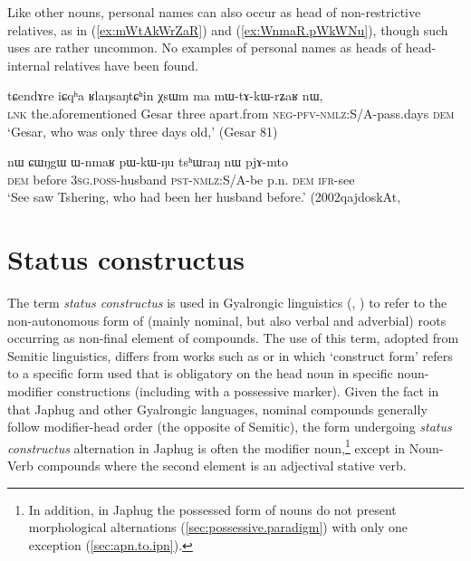 Like other nouns, personal names can also occur as head of non-restrictive relatives, as in  (\ref{ex:mWtAkWrZaR}) and (\ref{ex:WnmaR.pWkWNu}), though such uses are rather uncommon. No examples of personal names as heads of head-internal relatives have been found.

  \begin{exe}
\ex \label{ex:mWtAkWrZaR}
\gll  tɕendɤre 	iɕqʰa 	ʁlaŋsaŋtɕʰin 	χsɯm 	ma 	mɯ-tɤ-kɯ-rʑaʁ 	nɯ, \\
\textsc{lnk} the.aforementioned Gesar three apart.from \textsc{neg}-\textsc{pfv}-\textsc{nmlz}:S/A-pass.days \textsc{dem} \\
\glt `Gesar, who was only three days old,'  (Gesar 81)
\end{exe}

\begin{exe}
\ex \label{ex:WnmaR.pWkWNu}
\gll nɯ ɕɯŋgɯ ɯ-nmaʁ pɯ-kɯ-ŋu tsʰɯraŋ nɯ pjɤ-mto  \\
\textsc{dem} before \textsc{3sg}.\textsc{poss}-husband \textsc{pst}-\textsc{nmlz}:S/A-be p.n. \textsc{dem} \textsc{ifr}-see \\
\glt `See saw Tshering, who had been her husband before.' (2002qajdoskAt, 
\end{exe}

\section{Status constructus} \label{sec:status.constructus}
The term \textit{status constructus} is used in Gyalrongic linguistics (\citealt{jacques12incorp}, \citealt[163-4]{lai17khroskyabs}) to refer to the non-autonomous form of (mainly nominal, but also verbal and adverbial) roots occurring as non-final element of compounds. The use of this term, adopted from Semitic linguistics,  differs from works such as \citet{creissels06hongrois} or \citet{creissels17construct} in which `construct form' refers to a specific form used that is obligatory on the head noun in specific noun-modifier constructions (including with a possessive marker). Given the fact in that Japhug and other Gyalrongic languages, nominal compounds generally follow modifier-head order (the opposite of Semitic), the form undergoing \textit{status constructus} alternation in Japhug is often the modifier noun,\footnote{In addition, in Japhug the possessed form of nouns do not present morphological alternations (\ref{sec:possessive.paradigm}) with only one exception (\ref{sec:apn.to.ipn}).} except in Noun-Verb compounds where the second element is an adjectival stative verb.

